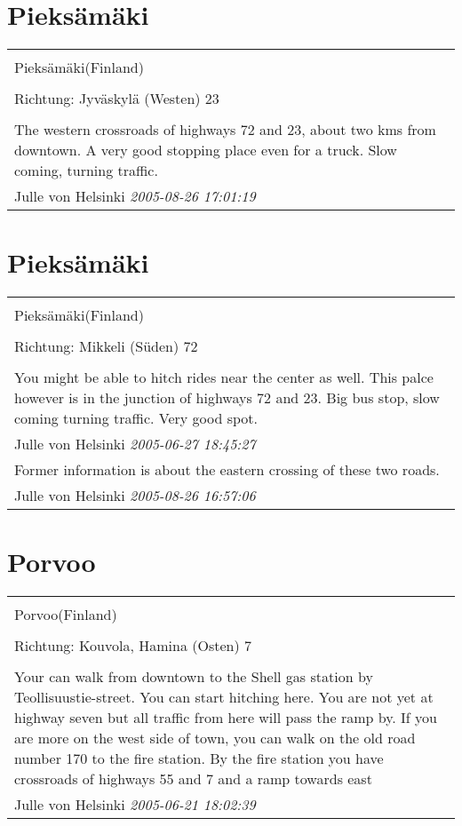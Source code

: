 \documentclass[a4paper,12pt]{article}
\begin{document}
\section{Pieksämäki}
\begin{tabular}{|p{13cm}|}
\hline\\
Pieksämäki(Finland)\\
\\
Richtung: Jyväskylä (Westen) 23 \\
\hline\\
The western crossroads of highways 72 and 23, about two kms from downtown. A very good stopping place even for a truck. Slow coming, turning traffic. \\
Julle von Helsinki \textit{ 2005-08-26 17:01:19 }\\\hline
\end{tabular}


\section{Pieksämäki}
\begin{tabular}{|p{13cm}|}
\hline\\
Pieksämäki(Finland)\\
\\
Richtung: Mikkeli (Süden) 72 \\
\hline\\
You might be able to hitch rides near the center as well. This palce however is in the junction of highways 72 and 23. Big bus stop, slow coming turning traffic. Very good spot. \\
Julle von Helsinki \textit{ 2005-06-27 18:45:27 }\\\hline Former information is about the eastern crossing of these two roads. \\
Julle von Helsinki \textit{ 2005-08-26 16:57:06 }\\\hline
\end{tabular}


\section{Porvoo}
\begin{tabular}{|p{13cm}|}
\hline\\
Porvoo(Finland)\\
\\
Richtung: Kouvola, Hamina (Osten) 7 \\
\hline\\
Your can walk from downtown to the Shell gas station by Teollisuustie-street. You can start hitching here. You are not yet at highway seven but all traffic from here will pass the ramp by. If you are more on the west side of town, you can walk on the old road number 170 to the fire station. By the fire station you have crossroads of highways 55 and 7 and a ramp towards east \\
Julle von Helsinki \textit{ 2005-06-21 18:02:39 }\\\hline
\end{tabular}
\end{document}
